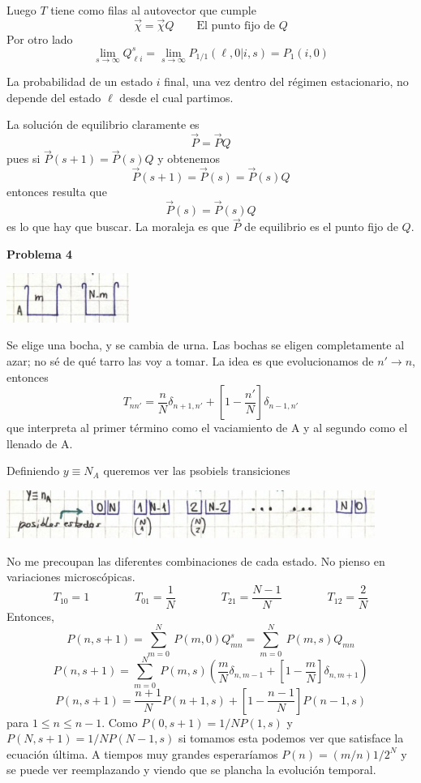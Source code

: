 \documentclass[10pt,oneside]{CBFT_book}
\begin{document}
Luego $T$ tiene como filas al autovector que cumple
\[
	\vec{\chi} = \vec{\chi} Q \qquad \text{El punto fijo de $Q$}
\]
Por otro lado
\[
	\lim_{s\to \infty} Q^s_{\ell i} = \lim_{s\to \infty} P_{1/1}(\ell, 0 | i,s) = P_1(i,0)
\]

La probabilidad de un estado $i$ final, una vez dentro del régimen estacionario, no depende del estado
$\ell$ desde el cual partimos.

La solución de equilibrio claramente es
\[
	\vec{P} = \vec{P} Q 
\]
pues si $\vec{P}(s+1) = \vec{P}(s)Q$ y obtenemos
\[
	\vec{P}(s+1) = \vec{P}(s) = \vec{P}(s)Q
\]
entonces resulta que 
\[
	\vec{P}(s)  = \vec{P}(s) Q
\]
es lo que hay que buscar.
La moraleja es que $\vec{P}$ de equilibrio es el punto fijo de $Q$.


\begin{ejemplo}{\bf Problema 4}
 
\includegraphics[width=0.30\textwidth]{images/1606329215.jpg}

Se elige una bocha, y se cambia de urna. Las bochas se eligen completamente al azar; no sé de qué 
tarro las voy a tomar.
La idea es que evolucionamos de $n' \to n$, entonces
\[
	T_{nn' } = \frac{n}{N} \delta_{n+1,n'} + \left[ 1 - \frac{n'}{N} \right] \delta_{n-1,n'}
\]
que interpreta al primer término como el vaciamiento de A y al segundo como el llenado de A.

Definiendo $y \equiv N_A$ queremos ver las psobiels transiciones

\includegraphics[width=0.90\textwidth]{images/1610808616.jpg}

No me precoupan las diferentes combinaciones de cada estado. No pienso en variaciones microscópicas.
\[
	T_{10} = 1 \qquad \qquad T_{01} = \frac 1 N \qquad \qquad 
	T_{21} = \frac {N-1} N \qquad \qquad T_{12} = \frac 2 N
\]
Entonces,
\[
	P(n,s+1) = \sum_{m=0}^N \: P(m,0) Q_{mn}^s = \sum_{m=0}^N \: P(m,s) Q_{mn}
\]
\[
	P(n,s+1) = \sum_{m=0}^N \: P(m,s) 
	\left( \frac{m}{N} \delta_{n,m-1} + \left[ 1 - \frac{m}{N} \right] \delta_{n,m+1} \right)
\]
\[
	P(n,s+1) = \frac{n+1}{N} P(n+1,s) + \left[ 1 - \frac{n-1}{N} \right] P(n-1,s)
\]
para $1 \leq n \leq n-1$. Como $P(0,s+1) = 1/N P(1,s)$ y $P(N,s+1)=1/N P(N-1,s)$ si tomamos esta
podemos ver que satisface la ecuación última.
A tiempos muy grandes esperaríamos $P(n)=(m/n) 1/2^N$ y se puede ver reemplazando y viendo que se
plancha la evolución temporal.
 
\end{ejemplo}
\end{document}
